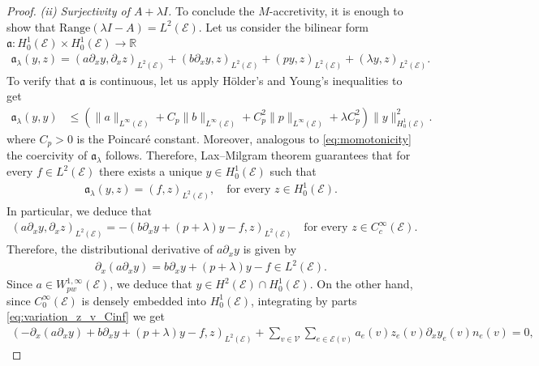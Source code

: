 \documentclass[a4paper, 10pt, english]{article}
\def\R{\mathbb R}
\def\to{\rightarrow}
\begin{document}
\begin{proof}
\smallbreak
\textit{(ii) Surjectivity of  $A+\lambda I$.} To conclude the $M$-accretivity, it is enough to show that
$\text{Range}(\lambda I - A) = L^2(\mathcal{E})$. Let us consider the bilinear form $\mathfrak{a}:H_0^1(\mathcal{E})\times H_0^1(\mathcal{E})\to \R$
    \begin{align*}
        \mathfrak{a}_\lambda(y,z)= (a\partial_x y, \partial_x z)_{L^2(\mathcal{E})} +(b\partial_x y,z)_{L^2(\mathcal{E})} + (py,z)_{L^2(\mathcal{E})}+(\lambda y,z)_{L^2(\mathcal{E})}.
    \end{align*}
To verify that $\mathfrak{a}$ is continuous, let us apply Hölder’s and Young’s inequalities to get
\begin{align}\label{eq:dissip2}
   \mathfrak{a}_\lambda (y,y)&\leq\left( \|a\|_{L^\infty(\mathcal{E})} +C_p\|b\|_{L^\infty(\mathcal{E})} +C_p^2\|p\|_{L^\infty(\mathcal{E})} +\lambda C_p^2 \right) \| y \|_{H^1_0(\mathcal{E})}^2.
\end{align}
where $C_p>0$ is the Poincaré constant. Moreover, analogous to \eqref{eq:momotonicity} the coercivity of $\mathfrak{a}_\lambda$ follows. Therefore, Lax--Milgram theorem guarantees that for every $f\in L^2(\mathcal{E}) $ there exists a unique 
$y\in H_0^1(\mathcal{E})$ such that
\begin{align*}
\mathfrak{a}_\lambda(y,z)
=
(f,z)_{L^2(\mathcal{E})},
\quad \text{for every }
z\in H_0^1(\mathcal{E}).
\end{align*}
In particular, we deduce that  
\begin{align}\label{eq:variation_z_v_Cinf}
    (a\partial_x y,\partial_x z)_{L^2(\mathcal{E})}= -( b\partial_x y +(p+\lambda)y -f,z)_{L^2(\mathcal{E})} \quad \text{for every }z\in C^\infty_{c}(\mathcal{E}).
\end{align}
Therefore, the distributional derivative of $a\partial_x y$ is given by 
\begin{align}\label{eq:distriv_deriv_y}
    \partial_x(a\partial_x y) = b\partial_x y +(p+\lambda)y -f\in L^2(\mathcal{E}).
\end{align}
Since $a\in W^{1,\infty}_{pw}(\mathcal{E})$, we deduce that $y\in H^2(\mathcal{E})\cap H_0^1(\mathcal{E})$. On the other hand, since $C^\infty_0(\mathcal{E})$ is densely embedded into $H^1_{0}(\mathcal{E})$, integrating by parts \eqref{eq:variation_z_v_Cinf} we get
\begin{align}\label{eq:des_var_Cinf}
    (-\partial_x(a\partial_x y) + b\partial_x y +(p+\lambda)y -f,z)_{L^2(\mathcal{E})}+\sum_{v\in \mathcal{V}}\sum_{e\in\mathcal{E}(v)}a_e(v)z_e(v)\partial_x y_e(v)n_e(v)=0,

\end{align}
\end{proof}
\end{document}
